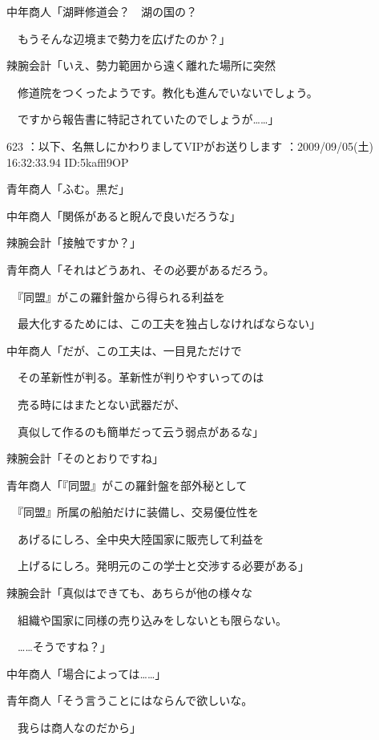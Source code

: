 \documentclass[a4j,twocolumn]{tarticle}
\begin{document}
中年商人「湖畔修道会？　湖の国の？\par{} 
　もうそんな辺境まで勢力を広げたのか？」 



辣腕会計「いえ、勢力範囲から遠く離れた場所に突然\par{} 
　修道院をつくったようです。教化も進んでいないでしょう。\par{} 
　ですから報告書に特記されていたのでしょうが……」 

	
    
    

623 ：以下、名無しにかわりましてVIPがお送りします ：2009/09/05(土) 16:32:33.94 ID:5kaffl9OP 


青年商人「ふむ。黒だ」\par{} 
中年商人「関係があると睨んで良いだろうな」 



辣腕会計「接触ですか？」\par{} 
青年商人「それはどうあれ、その必要があるだろう。\par{} 
　『同盟』がこの羅針盤から得られる利益を\par{} 
　最大化するためには、この工夫を独占しなければならない」 



中年商人「だが、この工夫は、一目見ただけで\par{} 
　その革新性が判る。革新性が判りやすいってのは\par{} 
　売る時にはまたとない武器だが、\par{} 
　真似して作るのも簡単だって云う弱点があるな」 



辣腕会計「そのとおりですね」 



青年商人「『同盟』がこの羅針盤を部外秘として\par{} 
　『同盟』所属の船舶だけに装備し、交易優位性を\par{} 
　あげるにしろ、全中央大陸国家に販売して利益を\par{} 
　上げるにしろ。発明元のこの学士と交渉する必要がある」



辣腕会計「真似はできても、あちらが他の様々な\par{} 
　組織や国家に同様の売り込みをしないとも限らない。\par{} 
　……そうですね？」 



中年商人「場合によっては……」\par{} 
青年商人「そう言うことにはならんで欲しいな。\par{} 
　我らは商人なのだから」 
\end{document}
